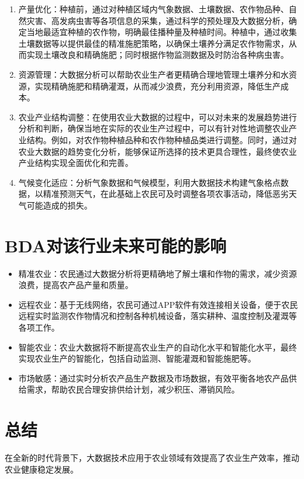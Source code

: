 \documentclass{article}
\begin{document}
\begin{enumerate}
    \item 产量优化：种植前，通过对种植区域内气象数据、土壤数据、农作物品种、自然灾害、高发病虫害等各项信息的采集，通过科学的预处理及大数据分析，确定当地最适宜种植的农作物，明确最佳播种量及种植时间。种植中，通过收集土壤数据等以提供最佳的精准施肥策略，以确保土壤养分满足农作物需求，从而实现土壤改良和精确施肥；同时根据作物监测数据及时防治各种病虫害。
    \item 资源管理：大数据分析可以帮助农业生产者更精确合理地管理土壤养分和水资源，实现精确施肥和精确灌溉，从而减少浪费，充分利用资源，降低生产成本。
    \item 农业产业结构调整：在使用农业大数据的过程中，可以对未来的发展趋势进行分析和判断，确保当地在实际的农业生产过程中，可以有针对性地调整农业产业结构。例如，对农作物种植品种和农作物种植品类进行调整。同时，通过对农业大数据的趋势变化分析，能够保证所选择的技术更具合理性，最终使农业产业结构实现全面优化和完善。
    \item 气候变化适应：分析气象数据和气候模型，利用大数据技术构建气象格点数据，以精准预测天气，在此基础上农民可及时调整各项农事活动，降低恶劣天气可能造成的损失。
\end{enumerate}

\section{BDA对该行业未来可能的影响}

\begin{itemize}
    \item 精准农业：农民通过大数据分析将更精确地了解土壤和作物的需求，减少资源浪费，提高农产品产量和质量。
    \item 远程农业：基于无线网络，农民可通过APP软件有效连接相关设备，便于农民远程实时监测农作物情况和控制各种机械设备，落实耕种、温度控制及灌溉等各项工作。
    \item 智能农业：农业大数据将不断提高农业生产的自动化水平和智能化水平，最终实现农业生产的智能化，包括自动监测、智能灌溉和智能施肥等。
    \item 市场敏感：通过实时分析农产品生产数据及市场数据，有效平衡各地农产品供给需求，帮助农民合理安排供给计划，减少积压、滞销风险。
\end{itemize}

\section{总结}

在全新的时代背景下，大数据技术应用于农业领域有效提高了农业生产效率，推动农业健康稳定发展。
\end{document}
